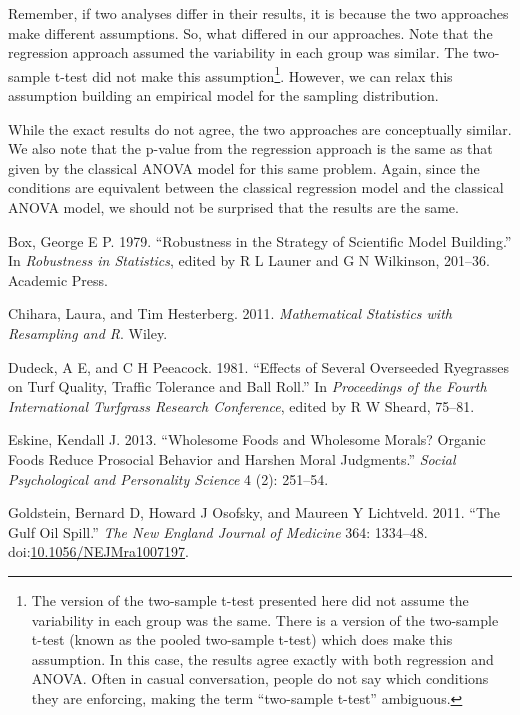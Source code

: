 \documentclass[]{book}
\let\rmarkdownfootnote\footnote%
\def\footnote{\protect\rmarkdownfootnote}
\theoremstyle{definition}
\theoremstyle{definition}
\theoremstyle{definition}
\theoremstyle{remark}
\begin{document}
Remember, if two analyses differ in their results, it is because the two
approaches make different assumptions. So, what differed in our
approaches. Note that the regression approach assumed the variability in
each group was similar. The two-sample t-test did not make this
assumption\footnote{The version of the two-sample t-test presented here
  did not assume the variability in each group was the same. There is a
  version of the two-sample t-test (known as the pooled two-sample
  t-test) which does make this assumption. In this case, the results
  agree exactly with both regression and ANOVA. Often in casual
  conversation, people do not say which conditions they are enforcing,
  making the term ``two-sample t-test'' ambiguous.}. However, we can
relax this assumption building an empirical model for the sampling
distribution.

While the exact results do not agree, the two approaches are
conceptually similar. We also note that the p-value from the regression
approach is the same as that given by the classical ANOVA model for this
same problem. Again, since the conditions are equivalent between the
classical regression model and the classical ANOVA model, we should not
be surprised that the results are the same.

\hypertarget{refs}{}
\hypertarget{ref-Box1979}{}
Box, George E P. 1979. ``Robustness in the Strategy of Scientific Model
Building.'' In \emph{Robustness in Statistics}, edited by R L Launer and
G N Wilkinson, 201--36. Academic Press.

\hypertarget{ref-Chihara2011}{}
Chihara, Laura, and Tim Hesterberg. 2011. \emph{Mathematical Statistics
with Resampling and R}. Wiley.

\hypertarget{ref-Dudeck1981}{}
Dudeck, A E, and C H Peeacock. 1981. ``Effects of Several Overseeded
Ryegrasses on Turf Quality, Traffic Tolerance and Ball Roll.'' In
\emph{Proceedings of the Fourth International Turfgrass Research
Conference}, edited by R W Sheard, 75--81.

\hypertarget{ref-Eskine2013}{}
Eskine, Kendall J. 2013. ``Wholesome Foods and Wholesome Morals? Organic
Foods Reduce Prosocial Behavior and Harshen Moral Judgments.''
\emph{Social Psychological and Personality Science} 4 (2): 251--54.

\hypertarget{ref-Goldstein2011}{}
Goldstein, Bernard D, Howard J Osofsky, and Maureen Y Lichtveld. 2011.
``The Gulf Oil Spill.'' \emph{The New England Journal of Medicine} 364:
1334--48.
doi:\href{https://doi.org/10.1056/NEJMra1007197}{10.1056/NEJMra1007197}.
\end{document}
